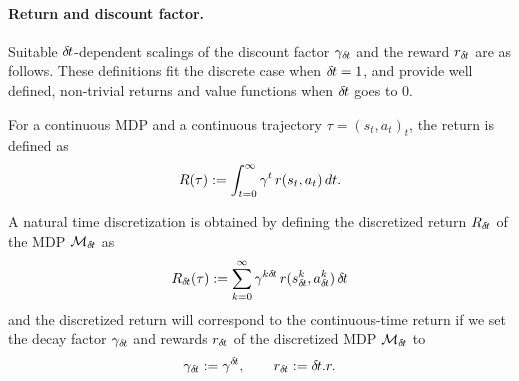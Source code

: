 



\paragraph{Return and discount factor.}
Suitable 
${\delta\hspace{-.1em}t}$-dependent scalings of the discount factor $\gamma_{\delta\hspace{-.1em}t}$
and the reward $r_{\delta\hspace{-.1em}t}$ are as follows. These definitions fit the discrete case
when ${\delta\hspace{-.1em}t}=1$, and provide well defined, non-trivial returns
and value functions when ${\delta\hspace{-.1em}t}$ goes to $0$.

For a continuous MDP and a continuous trajectory $\tau = (s_t, a_t)_t$,
the return is defined as~\cite{cont_rl}
\begin{equation}
\label{eq:continuous-return}
R(\tau) \mathrel{\mathop{:}}= \int_{t=0}^\infty\gamma^t\,r(s_t, a_t)\,dt.
\end{equation}

A natural time discretization is obtained  by defining the discretized
return $R_{\delta\hspace{-.1em}t}$ of the MDP $\mathcal{M}_{{\delta\hspace{-.1em}t}}$ as
\begin{equation}
\label{eq:discretized-return}
R_{\delta\hspace{-.1em}t}(\tau) \mathrel{\mathop{:}}= \sum_{k=0}^\infty\gamma^{k{\delta\hspace{-.1em}t}}\,
r(s_{\delta\hspace{-.1em}t}^k, a_{\delta\hspace{-.1em}t}^k)\,{\delta\hspace{-.1em}t}
\end{equation}
and the discretized return will correspond to the continuous-time return
if we set the decay factor $\gamma_{\delta\hspace{-.1em}t}$ and rewards $r_{\delta\hspace{-.1em}t}$ of
the discretized MDP ${\cal M}_{\delta\hspace{-.1em}t}$ to
\begin{align}
\label{eq:def-gamma}
\gamma_{\delta\hspace{-.1em}t} \mathrel{\mathop{:}}= \gamma^{\delta\hspace{-.1em}t},\qquad
r_{\delta\hspace{-.1em}t} \mathrel{\mathop{:}}= {\delta\hspace{-.1em}t} . r.
\end{align}


